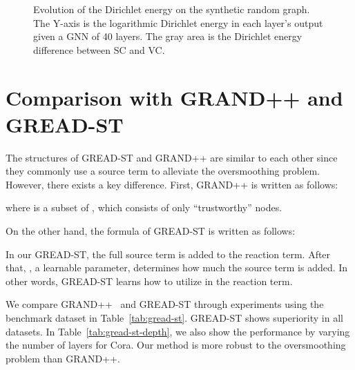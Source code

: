 \documentclass{article}
\theoremstyle{plain}
\theoremstyle{definition}
\theoremstyle{remark}
\begin{document}
\begin{figure}[ht!]
    \centering
    \caption{Evolution of the Dirichlet energy on the synthetic random graph. The Y-axis is the logarithmic Dirichlet energy in each layer’s output given a GNN of 40 layers. The gray area is the Dirichlet energy difference between SC and VC.}
    \label{fig:energy_beta}
\end{figure}

\clearpage

\section{Comparison with GRAND++ and GREAD-ST}
The structures of GREAD-ST and GRAND++ are similar to each other since they commonly use a source term to alleviate the oversmoothing problem. However, there exists a key difference. First, GRAND++ is written as follows:

where  is a subset of , which consists of only “trustworthy” nodes.

On the other hand, the formula of GREAD-ST is written as follows:


In our GREAD-ST, the full source term  is added to the reaction term. After that, , a learnable parameter, determines how much the source term is added. In other words, GREAD-ST learns how to utilize  in the reaction term.

We compare GRAND++~\cite{thorpe2022grands} and GREAD-ST through experiments using the benchmark dataset in Table~\ref{tab:gread-st}. GREAD-ST shows superiority in all datasets. In Table~\ref{tab:gread-st-depth}, we also show the performance by varying the number of layers for Cora. Our method is more robust to the oversmoothing problem than GRAND++.
\end{document}
